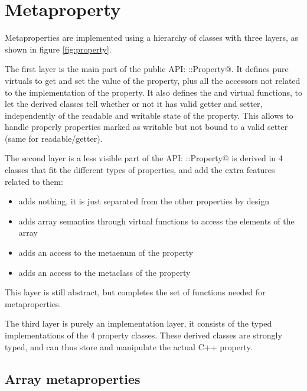 \documentclass[a4paper, twoside]{report}
\begin{document}

\chapter{Metaproperty}
\label{sec:property}

	Metaproperties are implemented using a hierarchy of classes with three layers, as shown in
	figure \ref{fig:property}.
	
	The first layer is the main part of the public API: \verb@camp::Property@. It defines pure virtuals to get and set
	the value of the property, plus all the accessors not related to the implementation of the property. It also
	defines the \verb@isReadable@ and \verb@isWritable@ virtual functions, to let the derived classes tell whether or not
	it has valid getter and setter, independently of the readable and writable state of the property. This allows to handle properly
	properties marked as writable but not bound to a valid setter (same for readable/getter).
	
	The second layer is a less visible part of the API: \verb@camp::Property@ is derived in 4 classes that
	fit the different types of properties, and add the extra features related to them:
	
	\begin{itemize}
		\item \verb@SimpleProperty@ adds nothing, it is just separated from the other properties by design
		\item \verb@ArrayProperty@ adds array semantics through virtual functions to access the elements of the array
		\item \verb@EnumProperty@ adds an access to the metaenum of the property
		\item \verb@UserProperty@ adds an access to the metaclass of the property
	\end{itemize}
	
	This layer is still abstract, but completes the set of functions needed for metaproperties.
	
	The third layer is purely an implementation layer, it consists of the typed implementations of the 4 property classes.
	These derived classes are strongly typed, and can thus store and manipulate the actual C++ property.


\section{Array metaproperties}
\end{document}
